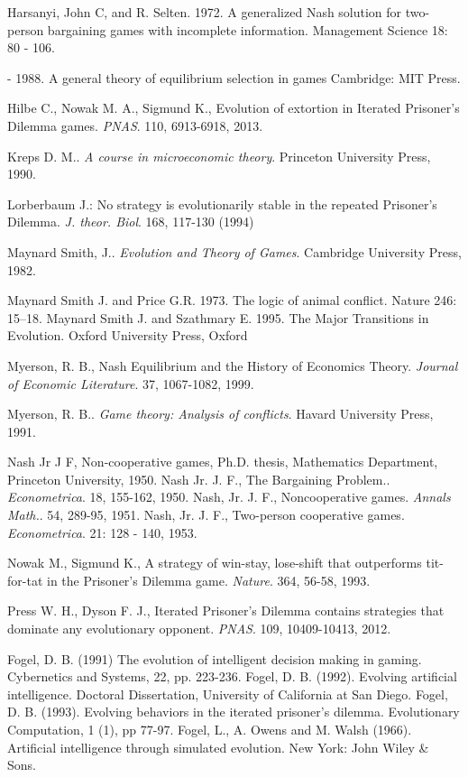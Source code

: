 \documentclass[12.5pt]{report}
\begin{document}
\begin{thebibliography}{}
 Harsanyi, John C, and R. Selten. 1972. A generalized Nash solution for two-person bargaining games with incomplete information. Management Science 18: 80 - 106.

 - 1988. A general theory of equilibrium selection in games Cambridge: MIT Press.

 Hilbe C., Nowak M. A., Sigmund K., Evolution of extortion in Iterated Prisoner's Dilemma games. {\emph{PNAS}}. 110, 6913-6918, 2013.


 Kreps D. M.. {\emph{A course in microeconomic theory}}. Princeton University Press, 1990. 

 Lorberbaum J.: No strategy is evolutionarily stable in the repeated Prisoner's Dilemma. \emph{J. theor. Biol}. 168, 117-130 (1994)


 Maynard Smith, J.. {\emph{Evolution and Theory of Games}}. Cambridge University Press, 1982. 

 Maynard Smith J. and Price G.R. 1973. The logic of animal conflict. Nature 246: 15–18. Maynard Smith J. and Szathmary E. 1995. The Major Transitions in Evolution. Oxford University Press, Oxford

 Myerson, R. B., Nash Equilibrium and the History of Economics Theory. {\emph{Journal of Economic Literature}}. 37, 1067-1082, 1999. 

 Myerson, R. B.. {\emph{Game theory: Analysis of conflicts}}. Havard University Press, 1991. 

 Nash Jr J F, Non-cooperative games, Ph.D. thesis, Mathematics Department, Princeton University, 1950.
 Nash Jr. J. F., The Bargaining Problem.. {\emph{Econometrica}}. 18, 155-162, 1950. 
 Nash, Jr. J. F., Noncooperative games. {\emph{Annals Math.}}. 54, 289-95, 1951. 
 Nash, Jr. J. F., Two-person cooperative games. {\emph{Econometrica}}. 21: 128 - 140, 1953.

 Nowak M., Sigmund K., A strategy of win-stay, lose-shift that outperforms tit-for-tat in the Prisoner's Dilemma game. {\emph{Nature}}. 364, 56-58, 1993. 

 Press W. H., Dyson F. J., Iterated Prisoner's Dilemma contains strategies that dominate any evolutionary opponent. {\emph{PNAS}}. 109, 10409-10413, 2012. 

 Fogel, D. B. (1991) The evolution of intelligent decision making in gaming. Cybernetics and Systems, 22, pp. 223-236.
Fogel, D. B. (1992). Evolving artificial intelligence. Doctoral Dissertation, University of California at San Diego.
Fogel, D. B. (1993). Evolving behaviors in the iterated prisoner’s dilemma. Evolutionary Computation, 1 (1), pp 77-97.
Fogel, L., A. Owens and M. Walsh (1966). Artificial intelligence through simulated evolution. New York: John Wiley \& Sons.


\end{thebibliography}
\end{document}
